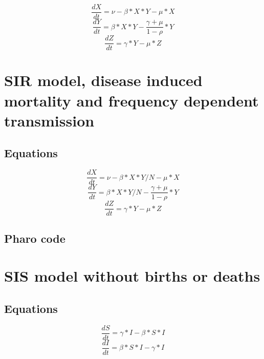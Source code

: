 \documentclass[a4paper,10pt,twoside]{book}
\begin{document}
\begin{equation}
\frac{dX}{dt} = \nu-\beta*X*Y-\mu*X
\end{equation}
\begin{equation}
\frac{dY}{dt} = \beta*X*Y-\frac{\gamma+\mu}{1-\rho}*Y
\end{equation}
\begin{equation}
\frac{dZ}{dt} = \gamma*Y-\mu*Z
\end{equation}
\section{ SIR model, disease induced mortality and frequency dependent transmission}\label{ SIR model, disease induced mortality and frequency dependent transmission}\subsection{ Equations}\label{ Equations}

\begin{equation}
\frac{dX}{dt} = \nu-\beta*X*Y/N-\mu*X
\end{equation}
\begin{equation}
\frac{dY}{dt} = \beta*X*Y/N-\frac{\gamma+\mu}{1-\rho}*Y
\end{equation}
\begin{equation}
\frac{dZ}{dt} = \gamma*Y-\mu*Z
\end{equation}
\subsection{ Pharo code}\label{ Pharo code}\section{ SIS model without births or deaths}\label{ SIS model without births or deaths}\subsection{Equations}\label{Equations}

\begin{equation}
\frac{dS}{dt} = \gamma*I-\beta*S*I
\end{equation}
\begin{equation}
\frac{dI}{dt} = \beta*S*I-\gamma*I
\end{equation}
\end{document}
